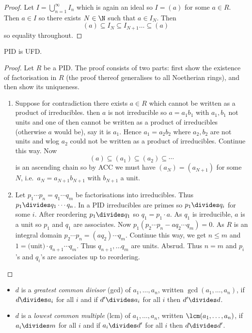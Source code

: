 \documentclass[a4paper]{article}
\theoremstyle{definition}
\begin{document}
\begin{proof}
  Let \(I = \bigcup_{n = 1}^\infty I_n\) which is again an ideal so \(I = (a)\) for some \(a \in R\). Then \(a \in I\) so there exists \(N \in \N\) such that \(a \in I_N\). Then
  \[
    (a) \subseteq I_N \subseteq I_{N + 1} \dots \subseteq (a)
  \]
  so equality throughout.
\end{proof}

\begin{theorem}
  PID is UFD.
\end{theorem}

\begin{proof}
  Let \(R\) be a PID. The proof consists of two parts: first show the existence of factorisation in \(R\) (the proof thereof generalises to all Noetherian rings), and then show its uniqueness.
  \begin{enumerate}
  \item Suppose for contradiction there exists \(a \in R\) which cannot be written as a product of irreducibles. then \(a\) is not irreducible so \(a = a_1b_1\) with \(a_1, b_1\) not units and one of then cannot be written as a product of irreducibles (otherwise \(a\) would be), say it is \(a_1\). Hence \(a_1 = a_2b_2\) where \(a_2, b_2\) are not units and wlog \(a_2\) could not be written as a product of irreducibles. Continue this way. Now
    \[
      (a) \subseteq (a_1) \subseteq (a_2) \subseteq \cdots
    \]
    is an ascending chain so by ACC we must have \((a_N) = (a_{N + 1})\) for some \(N\), i.e.\ \(a_N = a_{N + 1}b_{N + 1}\) with \(b_{N + 1}\) a unit.
  \item Let \(p_1 \cdots p_n = q_1 \cdots q_m\) be factorisations into irreducibles. Thus \(p_1 \divides q_1 \cdots q_n\). In a PID irreducibles are primes so \(p_1 \divides q_i\) for some \(i\). After reordering \(p_1 \divides q_1\) so \(q_1 = p_1 \cdot a\). As \(q_1\) is irreducible, \(a\) is a unit so \(p_1\) and \(q_1\) are associates. Now \(p_1(p_2 \cdots p_n - aq_2 \cdots q_m) = 0\). As \(R\) is an integral domain \(p_2 \cdots p_n = (aq_2) \cdots q_m\). Continue this way, we get \(n \leq m\) and \(1 = \text{(unit)} \cdot q_{n + 1} \cdots q_m\). Thus \(q_{n + 1}, \dots q_m\) are units. Absrud. Thus \(n = m\) and \(p_i\)'s and \(q_i\)'s are associates up to reordering.
  \end{enumerate}
\end{proof}

\begin{definition}\leavevmode
  \begin{itemize}
  \item \(d\) is a \emph{greatest common divisor} (gcd) of \(a_1, \dots, a_n\), written \(\gcd(a_1, \dots, a_n)\), if \(d \divides a_i\) for all \(i\) and if \(d' \divides a_i\) for all \(i\) then \(d' \divides d\).
  \item \(d\) is a \emph{lowest common multiple} (lcm) of \(a_1, \dots, a_n\), written \(\lcm(a_1, \dots, a_n)\), if \(a_i \divides m\) for all \(i\) and if \(a_i \divides d'\) for all \(i\) then \(d \divides d'\).
    \end{itemize}
\end{definition}
\end{document}

